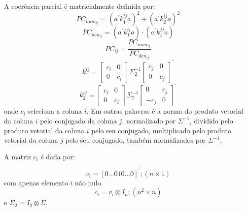 \documentclass[a4paper,10pt]{article}
\begin{document}
A coerência parcial é matricialmente definida por:
\begin{equation}
PC_{num_{ij}} = \left( a^{'} k_{1}^{ij} a \right)^{2} + \left( a^{'} k_{2}^{ij} a \right)^{2}
\end{equation}
\begin{equation}
PC_{den_{ij}} = \left( a^{'} k_{1}^{ii} a \right) \cdot \left( a^{'} k_{1}^{jj} a \right)
\end{equation}
\begin{equation}
PC_{ij} = \frac{PC_{num_{ij}}}{PC_{den_{ij}}}
\end{equation}
\begin{equation}
k_{1}^{ij} = \left[ \begin{array}{cc}
 c_{i} & 0 \\ 0 & c_{i}
\end{array} \right] \Sigma_{2}^{-1} \left[ \begin{array}{cc}
 c_{j} & 0 \\ 0 & c_{j}
\end{array} \right]^{'}
\end{equation}
\begin{equation}
k_{2}^{ij} = \left[ \begin{array}{cc}
 c_{i} & 0 \\ 0 & c_{i}
\end{array} \right] \Sigma_{2}^{-1} \left[ \begin{array}{cc}
 0 & c_{j} \\ -c_{j} & 0
\end{array} \right]^{'} 
\end{equation}
onde $c_i$ seleciona a coluna $i$. Em outras palavras é a norma do produto vetorial da coluna $i$ pelo conjugado da coluna $j$, normalizado por $\Sigma^{-1}$, dividido pelo produto vetorial da coluna $i$ pelo seu conjugado, multiplicado pelo produto vetorial da coluna $j$ pelo seu conjugado, também normalizados por $\Sigma^{-1}$.

A matriz $c_i$ é dada por:

\begin{equation}
v_{i} = [0 \dots 0 1 0 \dots 0]^{'}; (n \times 1)
\end{equation}
com apenas elemento $i$ não nulo.
\begin{equation}
c_{i} = v_{i} \otimes I_{n}; (n^{2} \times n)
\end{equation}
e $\Sigma_{2} = I_{2} \otimes \Sigma$.
\end{document}
